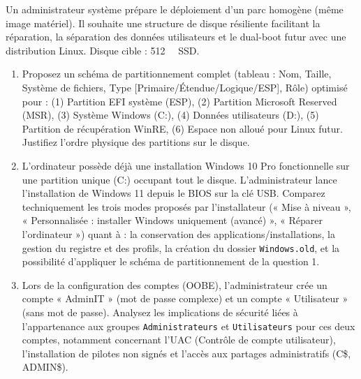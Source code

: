 \documentclass[11pt]{article}
\begin{document}
\begin{exercice}
Un administrateur système prépare le déploiement d'un parc homogène (même image matériel). Il souhaite une structure de disque résiliente facilitant la réparation, la séparation des données utilisateurs et le dual-boot futur avec une distribution Linux. Disque cible : \SI{512}{\giga\byte} SSD.
\begin{enumerate}
    \item Proposez un schéma de partitionnement complet (tableau : Nom, Taille, Système de fichiers, Type [Primaire/Étendue/Logique/ESP], Rôle) optimisé pour : (1) Partition EFI système (ESP), (2) Partition Microsoft Reserved (MSR), (3) Système Windows (C:), (4) Données utilisateurs (D:), (5) Partition de récupération WinRE, (6) Espace non alloué pour Linux futur. Justifiez l'ordre physique des partitions sur le disque.
    \item L'ordinateur possède déjà une installation Windows 10 Pro fonctionnelle sur une partition unique (C:) occupant tout le disque. L'administrateur lance l'installation de Windows 11 depuis le BIOS sur la clé USB. Comparez techniquement les trois modes proposés par l'installateur (« Mise à niveau », « Personnalisée : installer Windows uniquement (avancé) », « Réparer l'ordinateur ») quant à : la conservation des applications/installations, la gestion du registre et des profils, la création du dossier \texttt{Windows.old}, et la possibilité d'appliquer le schéma de partitionnement de la question 1.
    \item Lors de la configuration des comptes (OOBE), l'administrateur crée un compte « AdminIT » (mot de passe complexe) et un compte « Utilisateur » (sans mot de passe). Analysez les implications de sécurité liées à l'appartenance aux groupes \texttt{Administrateurs} et \texttt{Utilisateurs} pour ces deux comptes, notamment concernant l'UAC (Contrôle de compte utilisateur), l'installation de pilotes non signés et l'accès aux partages administratifs (C\$, ADMIN\$).
\end{enumerate}
\end{exercice}
\end{document}
